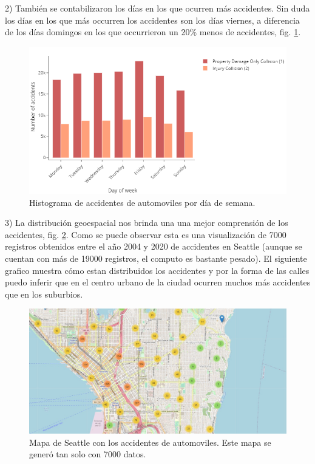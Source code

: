 \documentclass[12pt]{article}
\begin{document}
2) También se contabilizaron los días en los que ocurren más accidentes.  Sin duda los días en los que más occurren los accidentes son los días viernes, a diferencia de los días domingos en los que occurrieron un 20\% menos de accidentes, fig. \ref{fig:dayofweek}. \\
\begin{figure}[htbp]
    \centering
      \includegraphics[width=1\textwidth]{../images/day_of_week.png}
    \caption{Histograma de accidentes de automoviles por día de semana.}
    \label{fig:dayofweek}
  \end{figure}
  
  3) La distribución geoespacial nos brinda una una mejor comprensión de los accidentes, fig. \ref{fig:map}. Como se puede observar esta es una visualización de 7000 registros obtenidos entre el año 2004 y 2020 de accidentes en Seattle (aunque se cuentan con más de 19000 registros, el computo es bastante pesado). El siguiente grafico muestra cómo estan distribuidos los accidentes y por la forma de las calles puedo inferir que en el centro urbano de la ciudad ocurren muchos más accidentes que en los suburbios.\\

  \begin{figure}[htbp]
    \centering
      \includegraphics[width=1\textwidth]{../images/map_d.jpeg}
    \caption{Mapa de Seattle con los accidentes de automoviles. Este mapa se generó tan solo con 7000 datos. }
    \label{fig:map}
  \end{figure}
\end{document}
